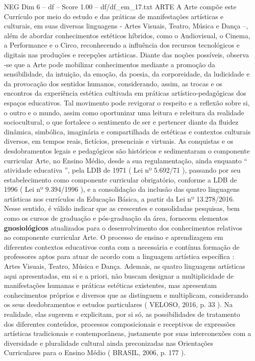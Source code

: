 \begin{textsample}{NEG Dim 6 – df – Score 1.00 – df/df\_em\_17.txt}  \label{ex:f6_neg_163}
ARTE A Arte compõe este Currículo por meio do estudo e das práticas de manifestações artísticas e culturais, em suas diversas linguagens - Artes Visuais, Teatro, Música e Dança –, além de abordar conhecimentos estéticos híbridos, como o Audiovisual, o Cinema, a Performance e o Circo, reconhecendo a influência dos recursos tecnológicos e digitais nas produções e recepções artísticas.
Diante das noções possíveis, observa -se que a Arte pode mobilizar conhecimentos mediante a promoção da sensibilidade, da intuição, da emoção, da poesia, da corporeidade, da ludicidade e da provocação dos sentidos humanos, considerando, assim, as trocas e os encontros da experiência estética cultivada em práticas artístico-pedagógicas dos espaços educativos.
Tal movimento pode revigorar o respeito e a reflexão sobre si, o outro e o mundo, assim como oportunizar uma leitura e releitura da realidade sociocultural, o que fortalece o sentimento de ser e pertencer diante da fluidez dinâmica, simbólica, imaginária e compartilhada de estéticas e contextos culturais diversos, em tempos reais, fictícios, presenciais e virtuais.
As conquistas e os desdobramentos legais e pedagógicos são históricos e sedimentaram o componente curricular Arte, no Ensino Médio, desde a sua regulamentação, ainda enquanto “ atividade educativa ”, pela LDB de 1971 ( Lei nº 5.692/71 ), passando por seu estabelecimento como componente curricular obrigatório, conforme a LDB de 1996 ( Lei nº 9.394/1996 ), e a consolidação da inclusão das quatro linguagens artísticas nos currículos da Educação Básica, a partir da Lei nº 13.278/2016.
Nesse sentido, é válido indicar que as crescentes e consolidadas pesquisas, bem como os cursos de graduação e pós-graduação da área, fornecem elementos \textbf{gnosiológicos} atualizados para o desenvolvimento dos conhecimentos relativos ao componente curricular Arte.
O processo de ensino e aprendizagem em diferentes contextos educativos conta com a necessária e contínua formação de professores aptos para atuar de acordo com a linguagem artística específica : Artes Visuais, Teatro, Música e Dança.
Ademais, as quatro linguagens artísticas aqui apresentadas, em si e a priori, não buscam designar a multiplicidade de manifestações humanas e práticas estéticas existentes, mas apresentam conhecimentos próprios e diversos que as distinguem e multiplicam, considerando os seus desdobramentos e estudos particulares ( VELOSO, 2016, p. 33 ).
Na realidade, elas sugerem e explicitam, por si só, as possibilidades de tratamento dos diferentes conteúdos, processos composicionais e receptivos de expressões artísticas tradicionais e contemporâneas, justamente por suas interconexões com a diversidade e pluralidade cultural ainda preconizadas nas Orientações Curriculares para o Ensino Médio ( BRASIL, 2006, p. 177 ).

\end{textsample}
